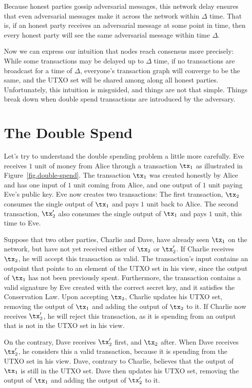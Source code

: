 Because honest parties gossip adversarial messages, this network delay ensures that
even adversarial messages make it across the network within $\Delta$ time. That is,
if an honest party receives an adversarial message at some point in time, then every
honest party will see the same adversarial message within time $\Delta$.

Now we can express our intuition that nodes reach consensus more precisely:
While some transactions may be delayed up to $\Delta$ time,
if no transactions are broadcast for a time of $\Delta$, everyone's transaction
graph will converge to be the same, and the UTXO set will be shared among along
all honest parties. Unfortunately, this intuition is misguided, and things are not
that simple. Things break down when double spend transactions are introduced
by the adversary.

\section{The Double Spend}

Let's try to understand the double spending problem a little more carefully. Eve
receives $1$ unit of money from Alice through a transaction $\tx_1$ as illustrated in
Figure~\ref{fig.double-spend}. The transaction $\tx_1$ was created honestly by Alice
and has one input of $1$ unit coming from Alice, and one output of $1$ unit paying
Eve's public key. Eve now creates two transactions: The first transaction, $\tx_2$
consumes the single output of $\tx_1$ and pays $1$ unit back to Alice. The second transaction,
$\tx_2'$ also consumes the single output of $\tx_1$ and pays $1$ unit, this time to Eve.

Suppose that two other parties, Charlie and Dave, have already seen $\tx_1$ on the network,
but have not yet received either of $\tx_2$ or $\tx_2'$. If Charlie receives $\tx_2$, he
will accept this transaction as valid. The transaction's input contains an outpoint that
points to an element of the UTXO set in his view, since the output of $\tx_1$ has not been
previously spent. Furthermore, the transaction contains a valid signature by Eve created
with the correct secret key, and it satisfies the Conservation Law. Upon accepting $\tx_2$,
Charlie updates his UTXO set, removing the output of $\tx_1$ and adding the output of
$\tx_2$ to it. If Charlie now receives $\tx_2'$, he will reject this transaction, as
it is spending from an output that is not in the UTXO set in his view.

On the contrary, Dave receives $\tx_2'$ first, and $\tx_2$ after. When Dave receives $\tx_2'$,
he considers this a valid transaction, because it is spending from the UTXO set in his view.
Dave, contrary to Charlie, believes that the output of $\tx_1$ is still in the UTXO set.
Dave then updates his UTXO set, removing the output of $\tx_1$ and adding the output
of $\tx_2'$ to it.

